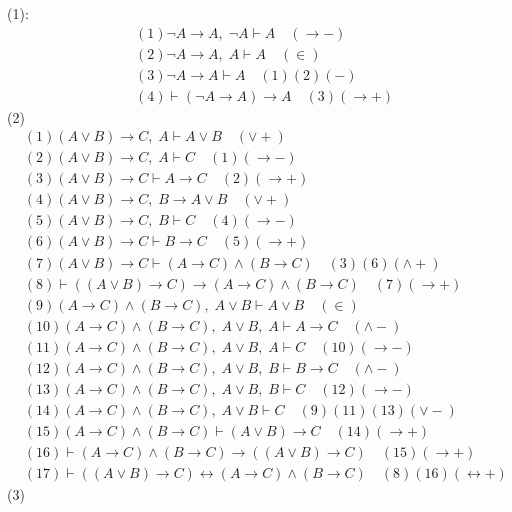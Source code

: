 \documentclass{article}
\begin{document}
(1):
\[
\begin{aligned}
&(1) \neg A \to A,\; \neg A \vdash A \quad (\to -) \\
&(2) \neg A \to A,\; A \vdash A \quad (\in) \\
&(3) \neg A \to A \vdash A \quad (1)(2)(-) \\
&(4) \vdash (\neg A \to A) \to A \quad (3)(\to +)
\end{aligned}    
\]
(2)
\[
\begin{aligned}
&(1) (A \vee B) \to C,\; A \vdash A \vee B \quad (\vee +) \\
&(2) (A \vee B) \to C,\; A \vdash C \quad (1)(\to -) \\
&(3) (A \vee B) \to C \vdash A \to C \quad (2)(\to +) \\
&(4) (A \vee B) \to C,\; B \to A \vee B \quad (\vee +) \\
&(5) (A \vee B) \to C,\; B \vdash C \quad (4)(\to -) \\
&(6) (A \vee B) \to C \vdash B \to C \quad (5)(\to +) \\
&(7) (A \vee B) \to C \vdash (A \to C) \wedge (B \to C) \quad (3)(6)(\wedge +) \\
&(8) \vdash ((A \vee B) \to C) \to (A \to C) \wedge (B \to C) \quad (7)(\to +) \\
&(9) (A \to C) \wedge (B \to C),\; A \vee B \vdash A \vee B \quad (\in) \\
&(10) (A \to C) \wedge (B \to C),\; A \vee B,\; A \vdash A \to C \quad (\wedge -) \\
&(11) (A \to C) \wedge (B \to C),\; A \vee B,\; A \vdash C \quad (10)(\to -) \\
&(12) (A \to C) \wedge (B \to C),\; A \vee B,\; B \vdash B \to C \quad (\wedge -) \\
&(13) (A \to C) \wedge (B \to C),\; A \vee B,\; B \vdash C \quad (12)(\to -) \\
&(14) (A \to C) \wedge (B \to C),\; A \vee B \vdash C \quad (9)(11)(13)(\vee -) \\
&(15) (A \to C) \wedge (B \to C) \vdash (A \vee B) \to C \quad (14)(\to +) \\
&(16) \vdash (A \to C) \wedge (B \to C) \to ((A \vee B) \to C) \quad (15)(\to +) \\
&(17) \vdash ((A \vee B) \to C) \leftrightarrow (A \to C) \wedge (B \to C) \quad (8)(16)(\leftrightarrow +)
\end{aligned}    
\]
(3)
\end{document}
